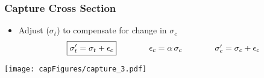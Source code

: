 \begin{frame}
\frametitle{Capture Cross Section}	
\begin{itemize} 
	\item Adjust  ($\sigma_t$) to compensate for change in $\sigma_c$
	\begin{equation*}
	\begin{array}{ccc}
	\boxed{\sigma'_t = \sigma_t + \epsilon_c}\hspace{0.4in} &  \epsilon_c = \alpha\,\sigma_c &\hspace{0.4in} \sigma'_c = \sigma_c + \epsilon_c%
	\end{array}
	\end{equation*}
	\end{itemize}
	\pause
\begin{minipage}{0.49\textwidth}
\begin{table}[t!] 
	\vspace{-0.63870in} \pause
  \begin{center}
  \end{center}
\end{table}
\end{minipage}
\begin{minipage}{0.49\textwidth}
\texttt{[image: capFigures/capture\_3.pdf]}
\end{minipage}	

\end{frame} 



